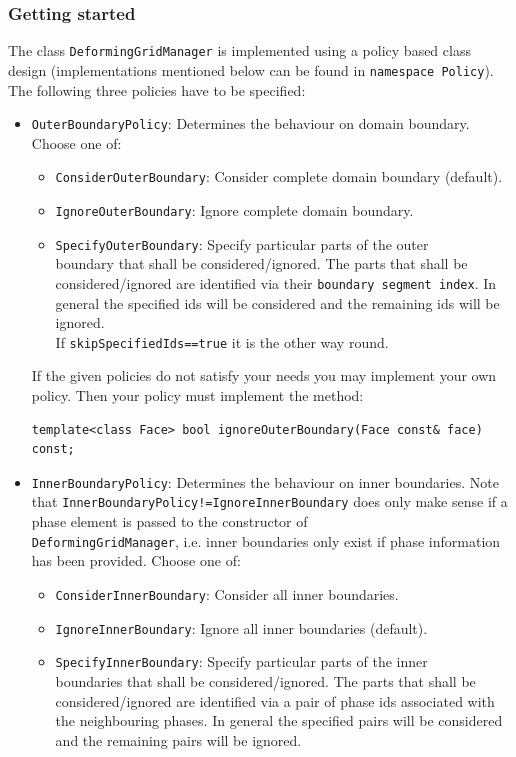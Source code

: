 \documentclass[11pt]{article}
\begin{document}
\subsubsection{Getting started}
The class \verb+DeformingGridManager+ is implemented using a policy based class design (implementations mentioned below can be found in \verb+namespace Policy+). 
The following three policies have to be specified:
\begin{itemize}
\item \verb+OuterBoundaryPolicy+: Determines the behaviour on domain boundary. Choose one of:
\begin{itemize}
\item \verb+ConsiderOuterBoundary+: Consider complete domain boundary (default). 
\item \verb+IgnoreOuterBoundary+: Ignore complete domain boundary.
\item \verb+SpecifyOuterBoundary+: Specify particular parts of the outer \\boundary that shall be considered/ignored. The parts that shall be considered/ignored are identified via their \verb+boundary segment index+. In general the specified ids will be considered and the remaining ids will be ignored. \\
If \verb+skipSpecifiedIds==true+ it is the other way round. 
\end{itemize}
If the given policies do not satisfy your needs you may implement your own policy. Then your policy must implement the method: 
\begin{lstlisting}
template<class Face> bool ignoreOuterBoundary(Face const& face) const;
\end{lstlisting}
\item \verb+InnerBoundaryPolicy+: Determines the behaviour on inner boundaries. 
Note that \verb+InnerBoundaryPolicy!=IgnoreInnerBoundary+ does only make sense if a phase element is passed to the constructor of \\ \verb+DeformingGridManager+, i.e. inner boundaries only exist if phase information has been provided.
Choose one of: 
\begin{itemize}
\item \verb+ConsiderInnerBoundary+: Consider all inner boundaries.
\item \verb+IgnoreInnerBoundary+: Ignore all inner boundaries (default).
\item \verb+SpecifyInnerBoundary+: Specify particular parts of the inner \\boundaries that shall be considered/ignored. The parts that shall be considered/ignored are identified via a pair of phase ids associated with the neighbouring phases. In general the specified pairs will be considered and the remaining pairs will be ignored. \\

\end{itemize}
\end{itemize}
\end{document}
